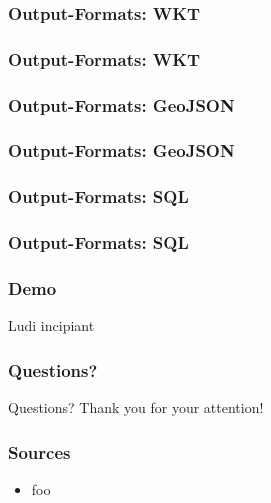 \documentclass{beamer}
\begin{document}
\begin{frame}
    \frametitle{Output-Formats: WKT}
    
\end{frame}

\begin{frame}
    \frametitle{Output-Formats: WKT}
    
\end{frame}

\begin{frame}
    \frametitle{Output-Formats: GeoJSON}
    
\end{frame}

\begin{frame}
    \frametitle{Output-Formats: GeoJSON}
    
\end{frame}

\begin{frame}
    \frametitle{Output-Formats: SQL}
    
\end{frame}

\begin{frame}
    \frametitle{Output-Formats: SQL}
    
\end{frame}

\begin{frame}
    \frametitle{Demo}
    \begin{center}
        Ludi incipiant
    \end{center}
\end{frame}

\begin{frame}
    \frametitle{Questions?}
    \begin{center}
    Questions?
    \newline Thank you for your attention!
    \end{center}
\end{frame}

\begin{frame}
    \frametitle{Sources}
    \begin{itemize}
        \item foo
    \end{itemize}
\end{frame}
\end{document}
